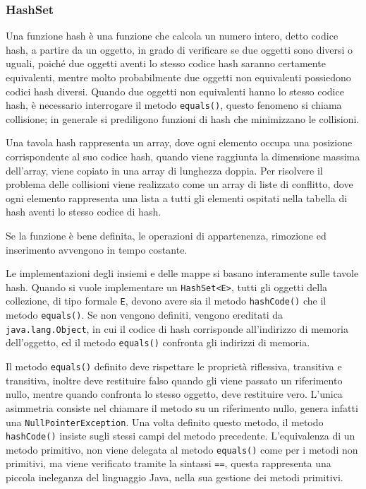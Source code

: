 \documentclass{article}
\numberwithin{equation}{subsection}
\begin{document}
\subsubsection{HashSet}

Una funzione hash è una funzione che calcola un numero intero, detto codice hash, a partire da un oggetto, in grado di verificare se due oggetti sono diversi o uguali, 
poiché due oggetti aventi lo stesso codice hash saranno certamente equivalenti, mentre molto probabilmente due oggetti non equivalenti possiedono codici hash diversi. 
Quando due oggetti non equivalenti hanno lo stesso codice hash, è necessario interrogare il metodo \verb|equals()|, questo fenomeno si chiama collisione; in generale 
si prediligono funzioni di hash che minimizzano le collisioni. 

Una tavola hash rappresenta un array, dove ogni elemento occupa una posizione corrispondente al suo codice hash, quando viene raggiunta la dimensione massima dell'array, 
viene copiato in una array di lunghezza doppia. 
Per risolvere il problema delle collisioni viene realizzato come un array di liste di conflitto, dove ogni elemento rappresenta una lista a tutti gli elementi ospitati 
nella tabella di hash aventi lo stesso codice di hash. 

Se la funzione è bene definita, le operazioni di appartenenza, rimozione ed inserimento avvengono in tempo costante. 

Le implementazioni degli insiemi e delle mappe si basano interamente sulle tavole hash. 
Quando si vuole implementare un \verb|HashSet<E>|, tutti gli oggetti della collezione, di tipo formale \verb|E|, devono avere sia il metodo \verb|hashCode()| che il metodo 
\verb|equals()|. 
Se non vengono definiti, vengono ereditati da \verb|java.lang.Object|, in cui il codice di hash corrisponde all'indirizzo di memoria dell'oggetto, ed il metodo \verb|equals()| 
confronta gli indirizzi di memoria. 

Il metodo \verb|equals()| definito deve rispettare le proprietà riflessiva, transitiva e transitiva, inoltre deve restituire falso quando gli viene passato un riferimento nullo, 
mentre quando confronta lo stesso oggetto, deve restituire vero. L'unica asimmetria consiste nel chiamare il metodo su un riferimento nullo, genera infatti una 
\verb|NullPointerException|. Una volta definito questo metodo, il metodo \verb|hashCode()| insiste sugli stessi campi del metodo precedente. 
L'equivalenza di un metodo primitivo, non viene delegata al metodo \verb|equals()| come per i metodi non primitivi, ma viene verificato tramite la sintassi \verb|==|, questa 
rappresenta una piccola ineleganza del linguaggio Java, nella sua gestione dei metodi primitivi. 
\end{document}
